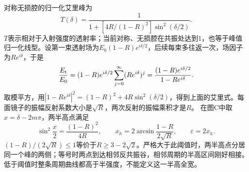\documentclass[UTF8,fontset=fandol,a4paper,11pt]{ctexart}
\begin{document}
对称无损腔的归一化艾里峰为
\[
T(\delta)=\frac1{1+[4R/(1-R)^2]\sin^2(\delta/2)}.
\]
$T$表示相对于入射强度的透射率；当前对称、无损腔在共振处达到1，也等于峰值归一化线型。设第一束透射场为$E_0(1-R)e^{i\delta/2}$，后续每束多往返一次，场因子为$Re^{i\delta}$，于是
\[
\frac{E_{\rm t}}{E_0}
=(1-R)e^{i\delta/2}\sum_{j=0}^{\infty}(Re^{i\delta})^j
=\frac{(1-R)e^{i\delta/2}}{1-Re^{i\delta}}.
\]
取模平方，用$|1-Re^{i\delta}|^2=(1-R)^2+4R\sin^2(\delta/2)$，得到上面的艾里式。每面镜子的振幅反射系数大小是$\sqrt R$，两次反射的振幅乘积才是$R$。
在图C中取$x=\delta-2m\pi$，两半高点满足
\[
\sin^2\frac{x}{2}=\frac{(1-R)^2}{4R},\qquad
x_h=2\arcsin\frac{1-R}{2\sqrt R},\qquad \varepsilon=2x_h.
\]
$(1-R)/(2\sqrt R)\le1$等价于$R\ge3-2\sqrt2$。严格大于此阈值时，两半高点分居同一个峰的两侧；等号时两点到达相邻反共振谷，相邻周期的半高区间刚好相接。低于阈值时整条周期曲线都高于半强度，不能定义这一半高全宽。
\end{document}
